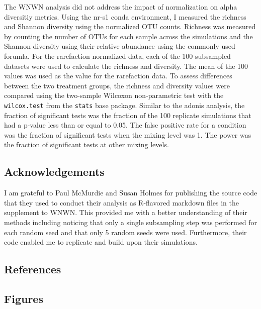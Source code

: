\documentclass[
]{article}
\newlength{\cslhangindent}
\newlength{\cslentryspacingunit} %
\newenvironment{CSLReferences}[2] %
 {%
  \setlength{\parindent}{0pt}
  \ifodd #1
  \let\oldpar\par
  \def\par{\hangindent=\cslhangindent\oldpar}
  \fi
  \setlength{\parskip}{#2\cslentryspacingunit}
 }%
 {}
\begin{document}
The WNWN analysis did not address the impact of normalization on alpha
diversitiy metrics. Using the nr-s1 conda environment, I measured the
richness and Shannon diversity using the normalized OTU counts. Richness
was measured by counting the number of OTUs for each sample across the
simulations and the Shannon diversity using their relative abundance
using the commonly used forumla. For the rarefaction normalized data,
each of the 100 subsampled datasets were used to calculate the richness
and diversity. The mean of the 100 values was used as the value for the
rarefaction data. To assess differences between the two treatment
groups, the richness and diversity values were compared using the
two-sample Wilcoxon non-parametric test with the \texttt{wilcox.test}
from the \texttt{stats} base package. Similar to the adonis analysis,
the fraction of significant tests was the fraction of the 100 replicate
simulations that had a p-value less than or equal to 0.05. The false
positive rate for a condition was the fraction of significant tests when
the mixing level was 1. The power was the fraction of significant tests
at other mixing levels.

\hypertarget{acknowledgements}{%
\subsection{Acknowledgements}\label{acknowledgements}}

I am grateful to Paul McMurdie and Susan Holmes for publishing the
source code that they used to conduct their analysis as R-flavored
markdown files in the supplement to WNWN. This provided me with a better
understanding of their methods including noticing that only a single
subsampling step was performed for each random seed and that only 5
random seeds were used. Furthermore, their code enabled me to replicate
and build upon their simulations.

\newpage

\hypertarget{references}{%
\subsection{References}\label{references}}

\setlength{\parindent}{-0.25in}
\setlength{\leftskip}{0.25in}

\noindent

\hypertarget{refs}{}
\begin{CSLReferences}{0}{0}
\end{CSLReferences}


\setlength{\parindent}{0in}
\setlength{\leftskip}{0in}

\newpage

\hypertarget{figures}{%
\subsection{Figures}\label{figures}}
\end{document}
